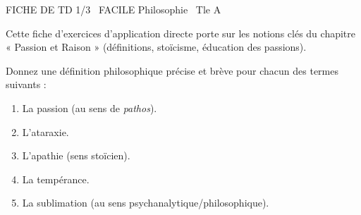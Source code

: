 \documentclass[11pt]{article}
\begin{document}
\begin{tcolorbox}[enhanced,colback=popink,colframe=popink,arc=10pt,boxrule=0pt,left=12pt,right=12pt,top=9pt,bottom=9pt]
{\color{white}\popxbold\small FICHE DE TD 1/3 \textbullet\ FACILE \hfill Philosophie \textbullet\ Tle A\par}
\end{tcolorbox}
\vspace{4pt}
\noindent Cette fiche d'exercices d'application directe porte sur les notions clés du chapitre « Passion et Raison » (définitions, stoïcisme, éducation des passions).

\begin{exercice}
Donnez une définition philosophique précise et brève pour chacun des termes suivants :
\begin{enumerate}
    \item La passion (au sens de \textit{pathos}).
    \item L'ataraxie.
    \item L'apathie (sens stoïcien).
    \item La tempérance.
    \item La sublimation (au sens psychanalytique/philosophique).
\end{enumerate}
\end{exercice}
\end{document}
